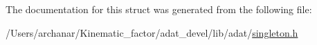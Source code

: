 The documentation for this struct was generated from the following file\+:\begin{DoxyCompactItemize}
\item 
/\+Users/archanar/\+Kinematic\+\_\+factor/adat\+\_\+devel/lib/adat/\mbox{\hyperlink{lib_2adat_2singleton_8h}{singleton.\+h}}\end{DoxyCompactItemize}
